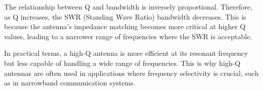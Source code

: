 The relationship between Q and bandwidth is inversely proportional. Therefore, as Q increases, the SWR (Standing Wave Ratio) bandwidth decreases. This is because the antenna's impedance matching becomes more critical at higher Q values, leading to a narrower range of frequencies where the SWR is acceptable.

In practical terms, a high-Q antenna is more efficient at its resonant frequency but less capable of handling a wide range of frequencies. This is why high-Q antennas are often used in applications where frequency selectivity is crucial, such as in narrowband communication systems.

